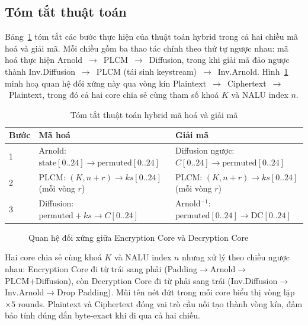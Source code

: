 \subsection{Tóm tắt thuật toán}

Bảng~\ref{tab:algo_summary} tóm tắt các bước thực hiện của thuật toán hybrid trong cả hai chiều mã hoá và giải mã. Mỗi chiều gồm ba thao tác chính theo thứ tự ngược nhau: mã hoá thực hiện Arnold~$\to$~PLCM~$\to$~Diffusion, trong khi giải mã đảo ngược thành Inv.Diffusion~$\to$~PLCM (tái sinh keystream)~$\to$~Inv.Arnold. Hình~\ref{fig:enc_vs_dec} minh hoạ quan hệ đối xứng này qua vòng kín Plaintext~$\to$~Ciphertext~$\to$~Plaintext, trong đó cả hai core chia sẻ cùng tham số khoá $K$ và NALU index $n$.

\begin{table}[ht]
\centering
\caption{Tóm tắt thuật toán hybrid mã hoá và giải mã}
\label{tab:algo_summary}
\begin{tabular}{|l|l|l|}
\hline
\textbf{Bước} & \textbf{Mã hoá} & \textbf{Giải mã} \\
\hline
1 & Arnold: $\text{state}[0..24] \to \text{permuted}[0..24]$ & Diffusion ngược: $C[0..24] \to \text{permuted}[0..24]$ \\
\hline
2 & PLCM: $(K, n{+}r) \to ks[0..24]$ (mỗi vòng $r$) & PLCM: $(K, n{+}r) \to ks[0..24]$ (mỗi vòng $r$) \\
\hline
3 & Diffusion: $\text{permuted} + ks \to C[0..24]$ & Arnold$^{-1}$: $\text{permuted}[0..24] \to \text{DC}[0..24]$ \\
\hline
\end{tabular}
\end{table}

\begin{figure}[ht]
\centering

\caption{Quan hệ đối xứng giữa Encryption Core và Decryption Core}
\label{fig:enc_vs_dec}
\end{figure}

Hai core chia sẻ cùng khoá $K$ và NALU index $n$ nhưng xử lý theo chiều ngược nhau: Encryption Core đi từ trái sang phải (Padding$\to$Arnold$\to$PLCM+Diffusion), còn Decryption Core đi từ phải sang trái (Inv.Diffusion$\to$Inv.Arnold$\to$Drop Padding). Mũi tên nét đứt trong mỗi core biểu thị vòng lặp $\times5$ rounds. Plaintext và Ciphertext đóng vai trò cầu nối tạo thành vòng kín, đảm bảo tính đúng đắn byte-exact khi đi qua cả hai chiều.
